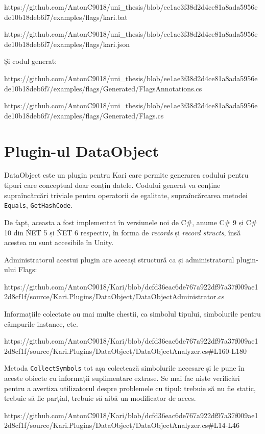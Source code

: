 \documentclass[a4paper,12pt]{report}
\begin{document}
https://github.com/AntonC9018/uni_thesis/blob/ee1ae3f38d2d4ce81a8ada5956ede10b18deb6f7/examples/flags/kari.bat

https://github.com/AntonC9018/uni_thesis/blob/ee1ae3f38d2d4ce81a8ada5956ede10b18deb6f7/examples/flags/kari.json


Și codul generat:

https://github.com/AntonC9018/uni_thesis/blob/ee1ae3f38d2d4ce81a8ada5956ede10b18deb6f7/examples/flags/Generated/FlagsAnnotations.cs

https://github.com/AntonC9018/uni_thesis/blob/ee1ae3f38d2d4ce81a8ada5956ede10b18deb6f7/examples/flags/Generated/Flags.cs

\section{Plugin-ul DataObject}

DataObject este un plugin pentru Kari care permite generarea codului pentru tipuri care conceptual doar conțin datele.
Codului generat va conține supraîncărcări triviale pentru operatorii de egalitate, supraîncărcarea metodei \texttt{Equals}, \texttt{GetHashCode}.

De fapt, aceasta a fost implementat în versiunele noi de C\#, anume C\# 9 și C\# 10 din \. NET 5 și \. NET 6 respectiv, în forma de \emph{records} și \emph{record structs}, însă acestea nu sunt accesibile în Unity.\cite{records_in_csharp}

Administratorul acestui plugin are aceeași structură ca și administratorul plugin-ului Flags:

https://github.com/AntonC9018/Kari/blob/dcfd36eac6de767a922df97a37f009ae12d8cf1f/source/Kari.Plugins/DataObject/DataObjectAdministrator.cs

Informațiile colectate au mai multe chestii, ca simbolul tipului, simbolurile pentru câmpurile instance, etc.

https://github.com/AntonC9018/Kari/blob/dcfd36eac6de767a922df97a37f009ae12d8cf1f/source/Kari.Plugins/DataObject/DataObjectAnalyzer.cs#L160-L180

Metoda \texttt{CollectSymbols} tot așa colectează simbolurile necesare și le pune în aceste obiecte cu informații suplimentare extrase.
Se mai fac niște verificări pentru a avertiza utilizatorul despre problemele cu tipul: trebuie să nu fie static, trebuie să fie parțial, trebuie să aibă un modificator de acces.

https://github.com/AntonC9018/Kari/blob/dcfd36eac6de767a922df97a37f009ae12d8cf1f/source/Kari.Plugins/DataObject/DataObjectAnalyzer.cs#L14-L46
\end{document}
